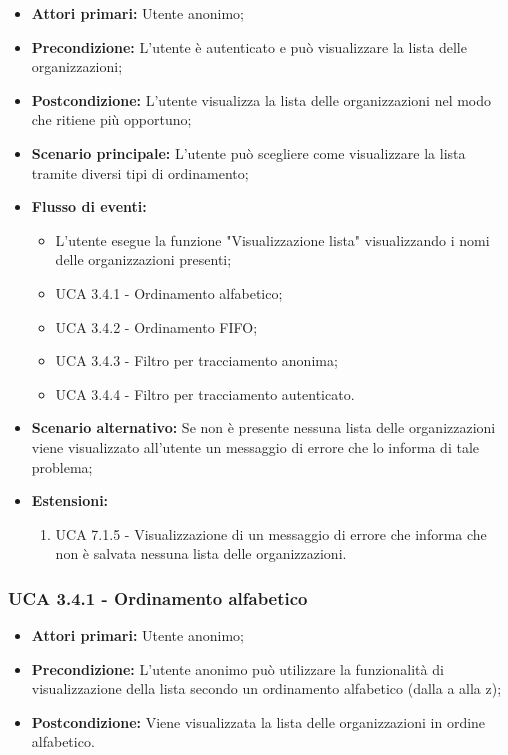 \begin{itemize} 
	\item \textbf{Attori primari:} Utente anonimo;
	\item \textbf{Precondizione:}  L'utente è autenticato e può visualizzare la lista delle organizzazioni;
	\item \textbf{Postcondizione:} L'utente visualizza la lista delle organizzazioni nel modo che ritiene più opportuno;
	\item \textbf{Scenario principale:}	L'utente può scegliere come visualizzare la lista tramite diversi tipi di ordinamento;
	\item \textbf{Flusso di eventi:}
	\begin{itemize}
		\item L'utente esegue la funzione "Visualizzazione lista" visualizzando i nomi delle organizzazioni presenti;
		\item UCA 3.4.1 - Ordinamento alfabetico;
		\item UCA 3.4.2 - Ordinamento FIFO;
		\item UCA 3.4.3 - Filtro per tracciamento anonima;
		\item UCA 3.4.4 - Filtro per tracciamento autenticato.
	\end{itemize}
	\item \textbf{Scenario alternativo:} Se non è presente nessuna lista delle organizzazioni viene visualizzato all'utente un messaggio di errore che lo informa di tale problema;
	\item \textbf{Estensioni:}
	\begin{enumerate}
		\item UCA 7.1.5 - Visualizzazione di un messaggio di errore che informa che non è salvata nessuna lista delle organizzazioni.
	\end{enumerate}
\end{itemize}

\subsubsection{UCA 3.4.1 - Ordinamento alfabetico}%
\begin{itemize}
	\item \textbf{Attori primari:} Utente anonimo;
	\item \textbf{Precondizione:} L'utente anonimo può utilizzare la funzionalità di visualizzazione della lista secondo un ordinamento alfabetico (dalla a alla z);
	\item \textbf{Postcondizione:} Viene visualizzata la lista delle organizzazioni in ordine alfabetico.
\end{itemize}


